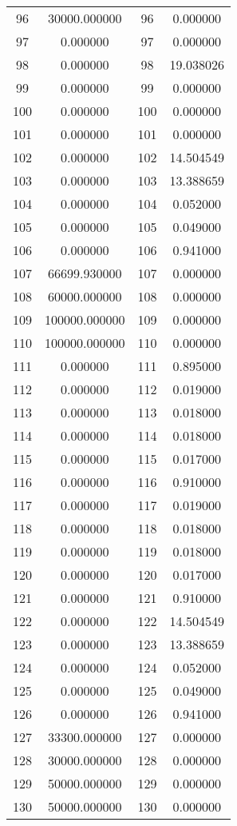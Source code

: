 \documentclass[12pt]{article}
\begin{document}
\begin{longtable}{@{}cccc@{}}
96 & 30000.000000 & 96 & 0.000000 \\
97 & 0.000000 & 97 & 0.000000 \\
98 & 0.000000 & 98 & 19.038026 \\
99 & 0.000000 & 99 & 0.000000 \\
100 & 0.000000 & 100 & 0.000000 \\
101 & 0.000000 & 101 & 0.000000 \\
102 & 0.000000 & 102 & 14.504549 \\
103 & 0.000000 & 103 & 13.388659 \\
104 & 0.000000 & 104 & 0.052000 \\
105 & 0.000000 & 105 & 0.049000 \\
106 & 0.000000 & 106 & 0.941000 \\
107 & 66699.930000 & 107 & 0.000000 \\
108 & 60000.000000 & 108 & 0.000000 \\
109 & 100000.000000 & 109 & 0.000000 \\
110 & 100000.000000 & 110 & 0.000000 \\
111 & 0.000000 & 111 & 0.895000 \\
112 & 0.000000 & 112 & 0.019000 \\
113 & 0.000000 & 113 & 0.018000 \\
114 & 0.000000 & 114 & 0.018000 \\
115 & 0.000000 & 115 & 0.017000 \\
116 & 0.000000 & 116 & 0.910000 \\
117 & 0.000000 & 117 & 0.019000 \\
118 & 0.000000 & 118 & 0.018000 \\
119 & 0.000000 & 119 & 0.018000 \\
120 & 0.000000 & 120 & 0.017000 \\
121 & 0.000000 & 121 & 0.910000 \\
122 & 0.000000 & 122 & 14.504549 \\
123 & 0.000000 & 123 & 13.388659 \\
124 & 0.000000 & 124 & 0.052000 \\
125 & 0.000000 & 125 & 0.049000 \\
126 & 0.000000 & 126 & 0.941000 \\
127 & 33300.000000 & 127 & 0.000000 \\
128 & 30000.000000 & 128 & 0.000000 \\
129 & 50000.000000 & 129 & 0.000000 \\
130 & 50000.000000 & 130 & 0.000000 \\

\end{longtable}
\end{document}
